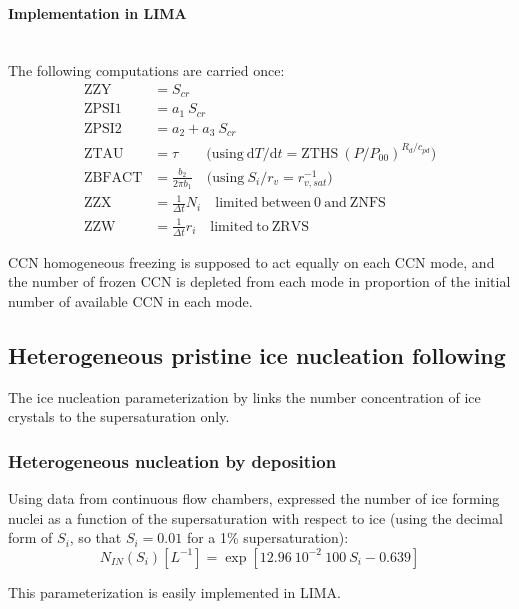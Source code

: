 \paragraph{Implementation in LIMA}
~\\
The following computations are carried once:
\begin{align}
 \mathrm{ZZY} &= S_{cr} \\
 \mathrm{ZPSI1} &= a_1 ~ S_{cr} \\
 \mathrm{ZPSI2} &= a_2 + a_3 ~ S_{cr} \\
 \mathrm{ZTAU} &= \tau \quad \quad \mathrm{(using~} \mathrm{d}T/\mathrm{d}t = \mathrm{ZTHS}~\left(P/P_{00}\right)^{R_d/c_{pd}} \mathrm{)} \\
 \mathrm{ZBFACT} &= \frac{b_2}{2 \pi b_1} \quad \mathrm{(using~} S_i/r_v = r_{v,sat}^{-1} \mathrm{)} \\
 \mathrm{ZZX} &= \frac{1}{\Delta t} N_i \quad \mathrm{limited~between~0~and~ZNFS} \\
 \mathrm{ZZW} &= \frac{1}{\Delta t} r_i \quad \mathrm{limited~to~ZRVS}
\end{align}

CCN homogeneous freezing is supposed to act equally on each CCN mode, and the number of frozen CCN is depleted from each mode in proportion of the initial number of available CCN in each mode.

\subsection{Heterogeneous pristine ice nucleation following \citet{Meyers1992}}

The ice nucleation parameterization by \citet{Meyers1992} links the number concentration of ice crystals to the supersaturation only.

\subsubsection{Heterogeneous nucleation by deposition}

Using data from continuous flow chambers, \citet[][Eq.\ (2.4)]{Meyers1992} expressed the number of ice forming nuclei as a function of the supersaturation with respect to ice (using the decimal form of $S_{i}$, so that $S_i=0.01$ for a 1\% supersaturation):
\begin{equation}
 N_{IN}(S_{i}) [L^{-1}] = \exp[12.96~10^{-2}~100~S_{i} - 0.639]
\end{equation}

This parameterization is easily implemented in LIMA.

